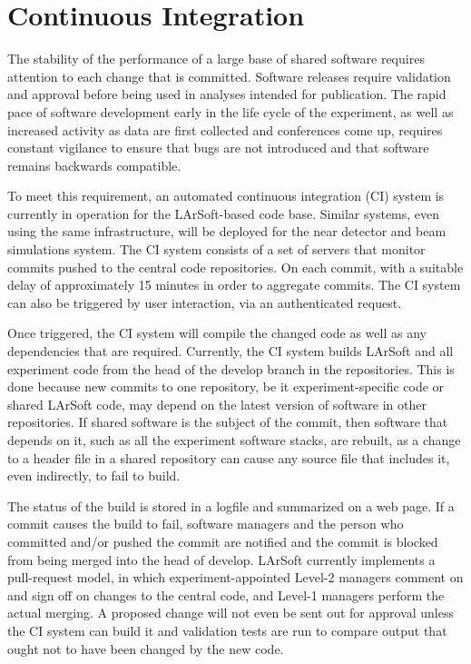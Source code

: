 \section{Continuous Integration}
\label{sec:codemgmt:ci}

The stability of the performance of a large base of shared software requires attention to each change that is committed.  Software releases require validation and approval before being used in analyses intended for publication.  The rapid pace of software development early in the life cycle of the experiment, as well as increased activity as data are first collected and conferences come up, requires constant vigilance to ensure that bugs are not introduced and that software remains backwards compatible.

To meet this requirement, an automated continuous integration (CI) system is currently in operation for the LArSoft-based code base.  Similar systems, even using the same infrastructure, will be deployed for the near detector and beam simulations system.  The CI system consists of a set of servers that monitor commits pushed to the central code repositories.  On each commit, with a suitable delay of approximately 15 minutes in order to aggregate commits.  The CI system can also be triggered by user interaction, via an authenticated request.

Once triggered, the CI system will compile the changed code as well as any dependencies that are required.  Currently, the CI system builds LArSoft and all experiment code from the head of the develop branch in the repositories.  This is done because new commits to one repository, be it experiment-specific code or shared LArSoft code, may depend on the latest version of software in other repositories.  If shared software is the subject of the commit, then software that depends on it, such as all the experiment software stacks, are rebuilt, as a change to a header file in a shared repository can cause any source file that includes it, even indirectly, to fail to build.

The status of the build is stored in a logfile and summarized on a web page.  If a commit causes the build to fail, software managers and the person who committed and/or pushed the commit are notified and the commit is blocked from being merged into the head of develop.  LArSoft currently implements a pull-request model, in which experiment-appointed Level-2 managers comment on and sign off on changes to the central code, and Level-1 managers perform the actual merging.  A proposed change will not even be sent out for approval unless the CI system can build it and validation tests are run to compare output that ought not to have been changed by the new code.

